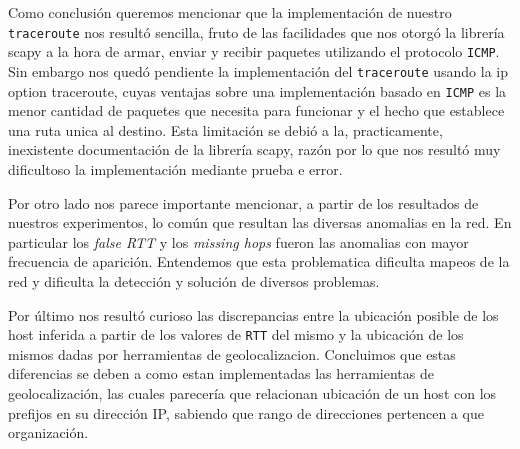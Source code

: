 Como conclusión queremos mencionar que la implementación de nuestro \texttt{traceroute} nos resultó sencilla, fruto de las facilidades que nos otorgó la librería scapy a la hora de armar, enviar y recibir paquetes utilizando el protocolo \texttt{ICMP}. Sin embargo nos quedó pendiente la implementación del \texttt{traceroute} usando la ip option traceroute, cuyas ventajas sobre una implementación basado en \texttt{ICMP} es la menor cantidad de paquetes que necesita para funcionar y el hecho que establece una ruta unica al destino. Esta limitación se debió a la, practicamente, inexistente documentación de la librería scapy, razón por lo que nos resultó muy dificultoso la implementación mediante prueba e error.

Por otro lado nos parece importante mencionar, a partir de los resultados de nuestros experimentos, lo común que resultan las diversas anomalias en la red. En particular los \textit{false RTT} y los \textit{missing hops} fueron las anomalias con mayor frecuencia de aparición. Entendemos que esta problematica dificulta mapeos de la red y dificulta la detección y solución de diversos problemas.

Por último nos resultó curioso las discrepancias entre la ubicación posible de los host inferida a partir de los valores de \texttt{RTT} del mismo y la ubicación de los mismos dadas por herramientas de geolocalizacion. Concluimos que estas diferencias se deben a como estan implementadas las herramientas de geolocalización, las cuales parecería que relacionan ubicación de un host con los prefijos en su dirección IP, sabiendo que rango de direcciones pertencen a que organización.
